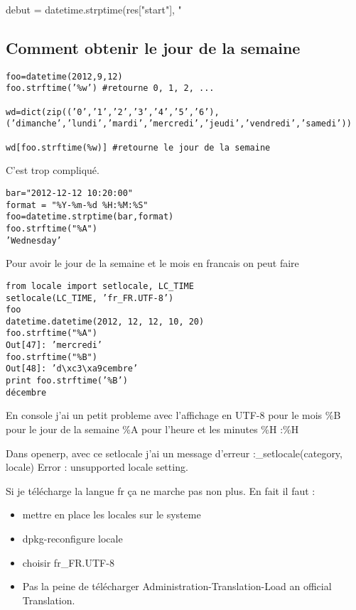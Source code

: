 \documentclass[12pt,a4paper]{article}
\begin{document}
debut = datetime.strptime(res["start"], "%

\subsection{Comment obtenir le jour de la semaine}

\begin{verbatim}
foo=datetime(2012,9,12)
foo.strftime(’%w’) #retourne 0, 1, 2, ...

wd=dict(zip((’0’,’1’,’2’,’3’,’4’,’5’,’6’),(’dimanche’,’lundi’,’mardi’,’mercredi’,’jeudi’,’vendredi’,’samedi’))

wd[foo.strftime(%w)] #retourne le jour de la semaine
\end{verbatim}

C'est trop compliqué.


\begin{verbatim}
bar="2012-12-12 10:20:00"
format = "%Y-%m-%d %H:%M:%S"
foo=datetime.strptime(bar,format)
foo.strftime("%A")
’Wednesday’
\end{verbatim}


Pour avoir le jour de la semaine et le mois en francais on peut faire


\begin{verbatim}
from locale import setlocale, LC_TIME
setlocale(LC_TIME, ’fr_FR.UTF-8’)
foo
datetime.datetime(2012, 12, 12, 10, 20)
foo.strftime("%A")
Out[47]: ’mercredi’
foo.strftime("%B")
Out[48]: ’d\xc3\xa9cembre’
print foo.strftime(’%B’)
décembre
\end{verbatim}

En console j’ai un petit probleme avec l’affichage en UTF-8
pour le mois \%B
pour le jour de la semaine \%A
pour l’heure et les minutes \%H :\%H

Dans openerp, avec ce setlocale j’ai un message d’erreur :\_setlocale(category, locale) Error : unsupported locale setting.

Si je télécharge la langue fr ça ne marche pas non plus. En fait il faut :

\begin{itemize}
\item mettre en place les locales sur le systeme
\item dpkg-reconfigure locale
\item choisir fr\_FR.UTF-8
\item  Pas la peine de télécharger Administration-Translation-Load an official Translation.
\end{itemize}
\end{document}
